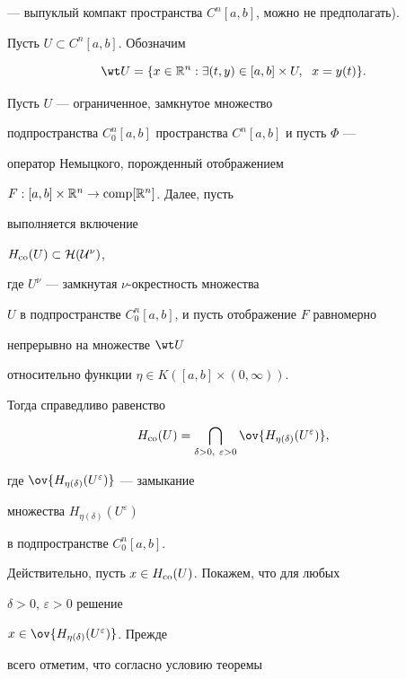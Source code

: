 --- выпуклый компакт пространства $C^n[a,b]$, можно не предполагать).





Пусть $U\subset C^n[a,b]$. Обозначим


$$


\wt U=\{x\in\Bbb R^n:\exists(t,y)\in[a,b]\times U,\ \; x=y(t)\}.


$$





\begin{thm} Пусть $U$ --- ограниченное, замкнутое множество


подпространства $C^n_0[a,b]$ пространства $C^n[a,b]$ и пусть $\Phi$ ---


оператор Немыцкого, порожденный отображением


$F:[a,b]\times\Bbb R^n\to\operatorname{comp}[\Bbb R^n]$. Далее, пусть


выполняется включение


$H_{\operatorname{co}}(U)\subset\cal H(U^\nu)$,


где $U^\nu$ --- замкнутая $\nu$-окрестность множества


$U$ в подпространстве $C^n_0[a,b]$, и пусть отображение $F$ равномерно


непрерывно на множестве $\wt U$


относительно функции $\eta\in K([a,b]\times (0,\infty))$.


Тогда справедливо равенство


$$


H_{\co}(U)=


\bigcap_{\delta>0,\ \varepsilon>0}


\ov{H_{\eta(\delta)}(U^\varepsilon)},


$$


где $\ov{H_{\eta(\delta)}(U^\varepsilon)}$ --- замыкание


множества $H_{\eta(\delta)}(U^\varepsilon)$


в подпространстве $C_0^n[a,b]$.


\end{thm}





Действительно, пусть $x\in H_{\operatorname{co}}(U)$. Покажем, что для любых


$\delta>0$, $\varepsilon>0$ решение


$x\in\ov{H_{\eta(\delta)}(U^\varepsilon)}$. Прежде


всего отметим, что согласно условию теоремы


